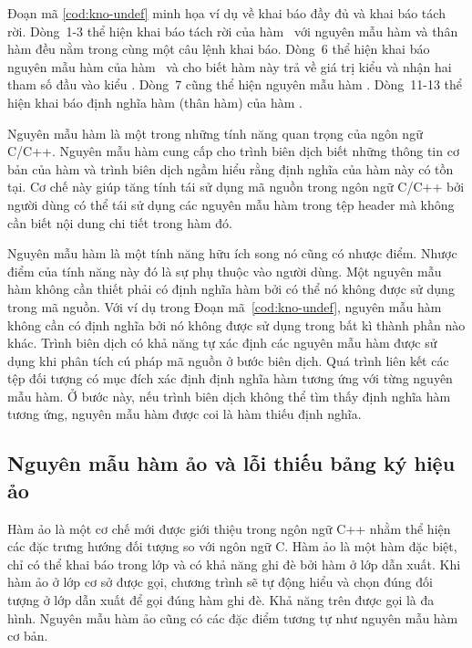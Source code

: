 Đoạn mã \ref{cod:kno-undef} minh họa ví dụ về khai báo đầy đủ và khai báo tách rời. Dòng~1-3 thể hiện khai báo tách rời của hàm~ với nguyên mẫu hàm và thân hàm đều nằm trong cùng một câu lệnh khai báo. Dòng~6 thể hiện khai báo nguyên mẫu hàm của hàm~ và cho biết hàm này trả về giá trị kiểu  và nhận hai tham số đầu vào kiểu . Dòng~7 cũng thể hiện nguyên mẫu hàm . Dòng~11-13 thể hiện khai báo định nghĩa hàm (thân hàm) của hàm .

Nguyên mẫu hàm là một trong những tính năng quan trọng của ngôn ngữ C/C++. Nguyên mẫu hàm cung cấp cho trình biên dịch biết những thông tin cơ bản của hàm và trình biên dịch ngầm hiểu rằng định nghĩa của hàm này có tồn tại. Cơ chế này giúp tăng tính tái sử dụng mã nguồn trong ngôn ngữ C/C++ bởi người dùng có thể tái sử dụng các nguyên mẫu hàm trong tệp header mà không cần biết nội dung chi tiết trong hàm đó.

Nguyên mẫu hàm là một tính năng hữu ích song nó cũng có nhược điểm. Nhược điểm của tính năng này đó là sự phụ thuộc vào người dùng. Một nguyên mẫu hàm không cần thiết phải có định nghĩa hàm bởi có thể nó không được sử dụng trong mã nguồn. Với ví dụ trong Đoạn mã~\ref{cod:kno-undef}, nguyên mẫu hàm  không cần có định nghĩa bởi nó không được sử dụng trong bất kì thành phần nào khác. Trình biên dịch có khả năng tự xác định các nguyên mẫu hàm được sử dụng khi phân tích cú pháp mã nguồn ở bước biên dịch. Quá trình liên kết các tệp đối tượng có mục đích xác định định nghĩa hàm tương ứng với từng nguyên mẫu hàm. Ở bước này, nếu trình biên dịch không thể tìm thấy định nghĩa hàm tương ứng, nguyên mẫu hàm được coi là hàm thiếu định nghĩa.
\subsection{Nguyên mẫu hàm ảo và lỗi thiếu bảng ký hiệu ảo}
Hàm ảo là một cơ chế mới được giới thiệu trong ngôn ngữ C++ nhằm thể hiện các đặc trưng hướng đối tượng so với ngôn ngữ C. Hàm ảo là một hàm đặc biệt, chỉ có thể khai báo trong lớp và có khả năng ghi đè bởi hàm ở lớp dẫn xuất. Khi hàm ảo ở lớp cơ sở được gọi, chương trình sẽ tự động hiểu và chọn đúng đối tượng ở lớp dẫn xuất để gọi đúng hàm ghi đè. Khả năng trên được gọi là đa hình. Nguyên mẫu hàm ảo cũng có các đặc điểm tương tự như nguyên mẫu hàm cơ bản.

